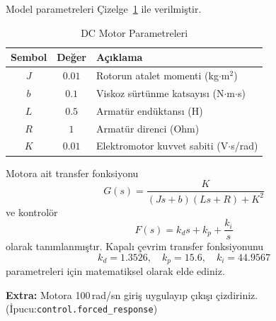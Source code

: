 Model parametreleri Çizelge~\ref{tbl:motor} ile verilmiştir.
\begin{table}[h!]
    \centering
    \caption{DC Motor Parametreleri}
    \label{tbl:motor}
    \begin{tabular}{|c|c|l|}
    \hline
    \textbf{Sembol} & \textbf{Değer} & \textbf{Açıklama} \\
    \hline
    $J$ & $0.01$ & Rotorun atalet momenti (kg$\cdot$m$^2$) \\
    $b$ & $0.1$ & Viskoz sürtünme katsayısı (N$\cdot$m$\cdot$s) \\
    $L$ & $0.5$ & Armatür endüktansı (H) \\
    $R$ & $1$ & Armatür direnci (Ohm) \\
    $K$ & $0.01$ & Elektromotor kuvvet sabiti (V$\cdot$s/rad) \\
    \hline
    \end{tabular}
\end{table}
Motora ait transfer fonksiyonu
\begin{equation}
    G(s)=\frac{K}{(Js+b)(Ls+R)+K^2}
\end{equation}
ve kontrolör
\begin{equation}
    F(s)=k_d s+k_p+\frac{k_i}{s}
\end{equation}
olarak tanımlanmıştır. Kapalı çevrim transfer fonksiyonunu 
\begin{equation}
    k_d=1.3526,\quad k_p=15.6,\quad k_i=44.9567
\end{equation}
parametreleri için matematiksel olarak elde ediniz.

\noindent\textbf{Extra:} Motora 100\,rad/sn giriş uygulayıp çıkışı çizdiriniz. (İpucu:\verb|control.forced_response|)
